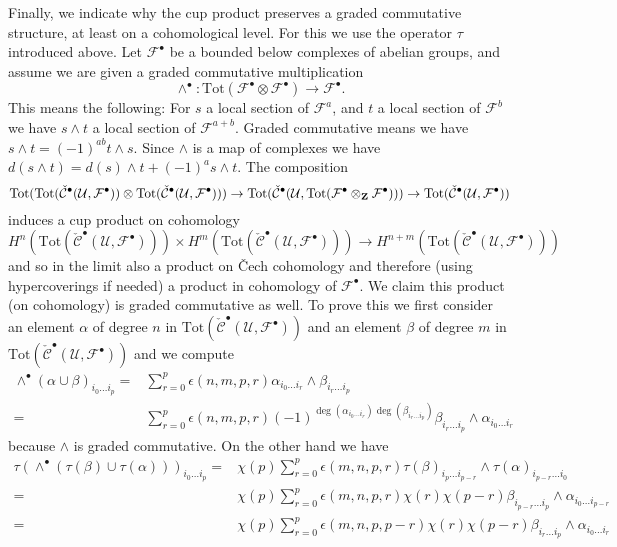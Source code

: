 \medskip\noindent
Finally, we indicate why the cup product preserves a graded commutative
structure, at least on a cohomological level. For this we use the operator
$\tau$ introduced above. Let ${\mathcal F}^\bullet$ be a bounded below
complexes of abelian groups, and assume we are given a graded commutative
multiplication
$$
\wedge^\bullet :
\text{Tot}({\mathcal F}^\bullet\otimes {\mathcal F}^\bullet)
\longrightarrow
{\mathcal F}^\bullet.
$$
This means the following: For $s$ a local section of
${\mathcal F}^a$, and $t$ a local section of ${\mathcal F}^b$
we have $s \wedge t$ a local section of ${\mathcal F}^{a + b}$.
Graded commutative means we have
$s \wedge t = (-1)^{ab} t \wedge s$. Since $\wedge$ is a map
of complexes we have
$d(s\wedge t) = d(s) \wedge t + (-1)^a s \wedge t$.
The composition
$$
\text{Tot}(
\text{Tot}(\check{\mathcal{C}}^\bullet({\mathcal U}, {\mathcal F}^\bullet))
\otimes
\text{Tot}(\check{\mathcal{C}}^\bullet({\mathcal U}, {\mathcal F}^\bullet))
)
\to
\text{Tot}(
\check{\mathcal{C}}^\bullet({\mathcal U},
\text{Tot}({\mathcal F}^\bullet\otimes_{\bf Z}{\mathcal F}^\bullet))
)
\to
\text{Tot}(\check{\mathcal{C}}^\bullet({\mathcal U}, {\mathcal F}^\bullet))
$$
induces a cup product on cohomology
$$
H^n(
\text{Tot}(\check{\mathcal{C}}^\bullet({\mathcal U}, {\mathcal F}^\bullet))
)
\times
H^m(
\text{Tot}(\check{\mathcal{C}}^\bullet({\mathcal U}, {\mathcal F}^\bullet))
)
\longrightarrow
H^{n + m}(
\text{Tot}(\check{\mathcal{C}}^\bullet({\mathcal U}, {\mathcal F}^\bullet))
)
$$
and so in the limit also a product on {\v C}ech cohomology
and therefore (using hypercoverings if needed) a product
in cohomology of ${\mathcal F}^\bullet$. We claim this product
(on cohomology) is graded commutative as well. To prove this
we first consider an element $\alpha$ of degree $n$ in
$\text{Tot}(\check{\mathcal{C}}^\bullet({\mathcal U}, {\mathcal F}^\bullet))$
and an element $\beta$ of degree $m$ in
$\text{Tot}(\check{\mathcal{C}}^\bullet({\mathcal U}, {\mathcal F}^\bullet))$
and we compute
\begin{align*}
\wedge^\bullet(\alpha \cup \beta)_{i_0 \ldots i_p}
= &
\sum\nolimits_{r = 0}^p
\epsilon(n, m, p, r)
\alpha_{i_0 \ldots i_r} \wedge \beta_{i_r \ldots i_p} \\
= &
\sum\nolimits_{r = 0}^p
\epsilon(n, m, p, r)
(-1)^{\deg(\alpha_{i_0 \ldots i_r})\deg(\beta_{i_r \ldots i_p})}
\beta_{i_r \ldots i_p} \wedge \alpha_{i_0 \ldots i_r}
\end{align*}
because $\wedge$ is graded commutative. On the other hand we have
\begin{align*}
\tau(\wedge^\bullet(\tau(\beta) \cup \tau(\alpha)))_{i_0 \ldots i_p}
= &
\chi(p)
\sum\nolimits_{r = 0}^p
\epsilon(m, n, p, r)
\tau(\beta)_{i_p \ldots i_{p - r}} \wedge \tau(\alpha)_{i_{p - r} \ldots i_0}
\\
= &
\chi(p)
\sum\nolimits_{r = 0}^p
\epsilon(m, n, p, r) \chi(r) \chi(p - r)
\beta_{i_{p - r} \ldots i_p} \wedge \alpha_{i_0 \ldots i_{p - r}}
\\
= &
\chi(p)
\sum\nolimits_{r = 0}^p
\epsilon(m, n, p, p - r) \chi(r) \chi(p - r)
\beta_{i_r \ldots i_p} \wedge \alpha_{i_0 \ldots i_r}
\end{align*}
